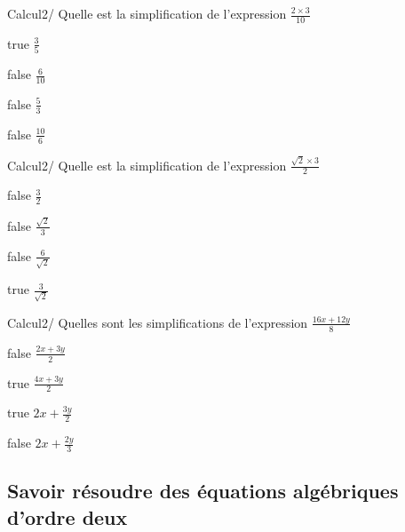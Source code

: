 \documentclass[11pt]{article}
\begin{document}
        	\begin{question}{9}{Calcul}{2}{/}
				Quelle est la simplification de l'expression $\frac{2 \times 3}{10}$
            \end{question}

            \begin{reponses}
            	\item[true] $\frac{3}{5}$
            	\item[false] $\frac{6}{10}$
                \item[false] $\frac{5}{3}$
                \item[false] $\frac{10}{6}$
            \end{reponses}
        
        	\begin{question}{9}{Calcul}{2}{/}
				Quelle est la simplification de l'expression $\frac{\sqrt{2} \times 3}{2}$
            \end{question}

            \begin{reponses}
            	\item[false] $\frac{3}{2}$
            	\item[false] $\frac{\sqrt{2}}{3}$
                \item[false] $\frac{6}{\sqrt{2}}$
                \item[true] $\frac{3}{\sqrt{2}}$
            \end{reponses}
        
        	\begin{question}{9}{Calcul}{2}{/}
				Quelles sont les simplifications de l'expression $\frac{16x+ 12y}{8}$
            \end{question}

            \begin{reponses}
            	\item[false] $\frac{2x+3y}{2}$
                \item[true] $\frac{4x+3y}{2}$
            	\item[true] $2x+\frac{3y}{2}$
                \item[false] $2x+\frac{2y}{3}$
            \end{reponses}
        
        \subsection{Savoir résoudre des équations algébriques d'ordre deux}
        
\end{document}

